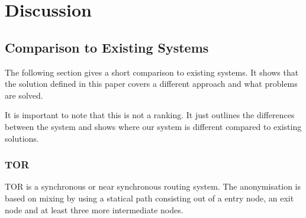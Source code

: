 \documentclass[9pt,journal,compsoc]{IEEEtran}
\begin{document}
%



\section{Discussion}

\subsection{Comparison to Existing Systems}
The following section gives a short comparison to existing systems. It shows that the solution defined in this paper covers a different approach and what problems are solved. 

It is important to note that this is not a ranking. It just outlines the differences between the system and shows where our system is different compared to existing solutions.
\subsubsection{TOR}
TOR\cite{tor-spec} is a synchronous or near synchronous routing system. The anonymisation is based on mixing by using a statical path consisting out of a entry node, an exit node and at least three more intermediate nodes.
\end{document}
